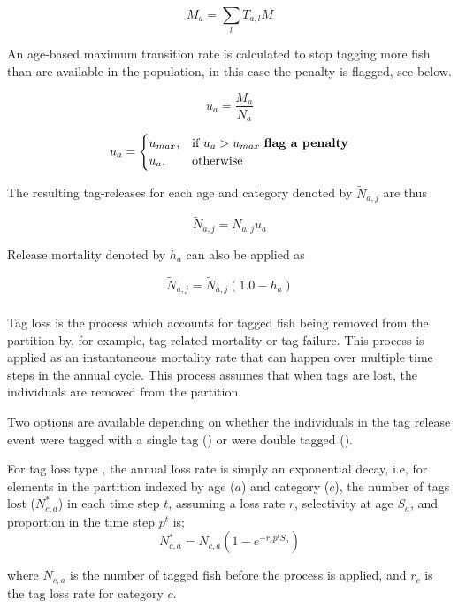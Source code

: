 $$ M_{a} = \sum_l T_{a,l}M  $$

An age-based maximum transition rate is calculated to stop tagging more fish than are available in the population, in this case the penalty is flagged, see below.

$$ u_{a} = \frac{ M_{a} }{ N_{a}}  $$

$$
u_{a} =
\begin{cases}
u_{max},& \text{if } u_{a} > u_{max} \text{ \textbf{flag a penalty}}\\
u_{a},  & \text{otherwise}
\end{cases}
$$

The resulting tag-releases for each age and category denoted by \(\widetilde{N}_{a,j}\) are thus

$$
\widetilde{N}_{a,j} = N_{a,j} u_{a}
$$

Release mortality denoted by \(h_a\) can also be applied as

$$\widetilde{N}_{a,j} = \widetilde{N}_{a,j}\left(1.0 - h_a\right)$$

\subsubsection{}\label{sec:Process-TagLoss} 

Tag loss is the process which accounts for tagged fish being removed from the partition by, for example, tag related mortality or tag failure. This process is applied as an instantaneous mortality rate that can happen over multiple time steps in the annual cycle. This process assumes that when tags are lost, the individuals are removed from the partition.

Two options are available depending on whether the individuals in the tag release event were tagged with a single tag () or were double tagged ().

For tag loss type , the annual loss rate is simply an exponential decay, i.e, for elements in the partition indexed by age ($a$) and category ($c$), the number of tags lost ($N^*_{c,a}$) in each time step $t$, assuming a loss rate $r$, selectivity at age $S_a$, and proportion in the time step $p^t$ is; 
\begin{equation}
	N^*_{c,a} = N_{c,a} (1 -e^{-r_c p^t S_a})
\end{equation}

where $N_{c,a}$ is the number of tagged fish before the process is applied, and $r_c$ is the tag loss rate for category $c$.

